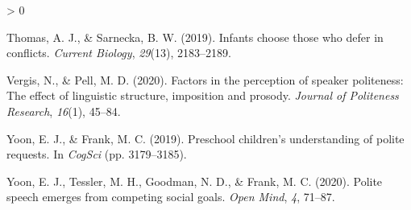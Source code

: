 \documentclass[
  english,
  man,floatsintext]{apa6}
\newlength{\cslhangindent}
\newenvironment{CSLReferences}[2] %
 {%
  \setlength{\parindent}{0pt}
  \ifodd #1 \everypar{\setlength{\hangindent}{\cslhangindent}}\ignorespaces\fi
  \ifnum #2 > 0
  \setlength{\parskip}{#2\baselineskip}
  \fi
 }%
 {}
\begin{document}
\begin{CSLReferences}{1}{0}
\leavevmode\hypertarget{ref-thomas2019}{}%
Thomas, A. J., \& Sarnecka, B. W. (2019). Infants choose those who defer in conflicts. \emph{Current Biology}, \emph{29}(13), 2183--2189.

\leavevmode\hypertarget{ref-vergis2020}{}%
Vergis, N., \& Pell, M. D. (2020). Factors in the perception of speaker politeness: The effect of linguistic structure, imposition and prosody. \emph{Journal of Politeness Research}, \emph{16}(1), 45--84.

\leavevmode\hypertarget{ref-yoon2019}{}%
Yoon, E. J., \& Frank, M. C. (2019). Preschool children's understanding of polite requests. In \emph{CogSci} (pp. 3179--3185).

\leavevmode\hypertarget{ref-yoon2020}{}%
Yoon, E. J., Tessler, M. H., Goodman, N. D., \& Frank, M. C. (2020). Polite speech emerges from competing social goals. \emph{Open Mind}, \emph{4}, 71--87.

\end{CSLReferences}

\endgroup
\end{document}

